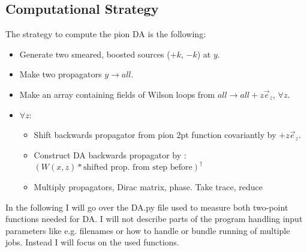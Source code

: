 \documentclass[a4paper,10pt]{scrartcl}
\begin{document}
\subsection{Computational Strategy}
The strategy to compute the pion DA is the following:
\begin{itemize}
    \item Generate two smeared, boosted sources ($+k$, $-k$) at $y$.
    \item Make two propagators $y \to all$.
    \item Make an array containing fields of Wilson loops from $all \to all +z \vec e_z$, $\forall z$.
    \item $\forall z$:
    \begin{itemize}
        \item Shift backwards propagator from pion 2pt function covariantly by $+z \vec e_z$.
        \item Construct DA backwards propagator by : $(W(x,z) * \text{shifted prop. from step before} )^\dagger$
        \item Multiply propagators, Dirac matrix, phase. Take trace, reduce
    \end{itemize}
\end{itemize}
In the following I will go over the DA.py file used to measure both two-point functions needed for DA. I will not describe parts of the program handling input parameters
like e.g. filenames or how to handle or bundle running of multiple jobs. Instead I will focus on the used functions.
\end{document}
